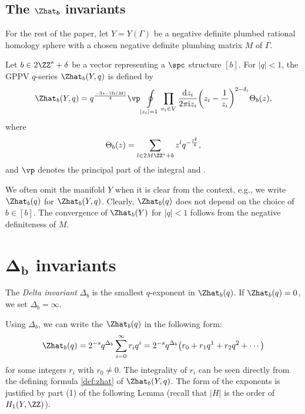 \documentclass[10pt,a4paper]{amsart}
\begin{document}
\subsection[The Zhat\_b invariants]{The $\boldsymbol{\Zhat_b}$ invariants}

For the rest of the paper, let $Y = Y(\Gamma)$ be a negative definite plumbed rational homology sphere with a chosen negative definite plumbing matrix $M$ of $\Gamma$.

\begin{Definition}
Let $b \in 2\ZZ^s + \delta$ be a vector representing a $\spc$ structure $[b]$. For $\lvert q \rvert<1$, the GPPV $q$-series $\Zhat_b(Y,q)$ is defined by
\begin{equation}\label{def:zhat}
 \Zhat_b(Y,q) = q^{\frac{-3s - \Tr(M)}{4}} \vp\oint\limits_{\lvert z_i \rvert = 1}\prod_{v_i\in V} \frac{{\rm d}z_i}{2\pi {\rm i} z_i} \biggl(z_i - \frac{1}{z_i}\biggr)^{2-\delta_i} \Theta_{b}(z),
\end{equation}
where
\begin{equation}\label{eq:theta}
 \Theta_{b}(z) = \sum_{l \in 2M\ZZ^s + b} z^l q^{-\frac{l^2}{4}},
\end{equation}
and $\vp$ denotes the principal part of the integral and .
\end{Definition}

We often omit the manifold $Y$ when it is clear from the context, e.g., we write~$\Zhat_b(q)$ for $\Zhat_b(Y,q)$. Clearly, $\Zhat_b(q)$ does not depend on the choice of $b \in [b]$. The convergence of $\Zhat_b(Y)$ for $\lvert q \rvert<1$ follows from the negative definiteness of $M$.

\section[Delta\_b invariants]{$\boldsymbol{\Delta_b}$ invariants}

\begin{Definition}
The \emph{Delta invariant} $\Delta_b$ is the smallest $q$-exponent in $\Zhat_b(q)$. If $\Zhat_b(q) = 0$, we set $\Delta_b = \infty$.
\end{Definition}

Using $\Delta_b$, we can write the $\Zhat_b(q)$ in the following form:
\[
 \Zhat_b(q) = 2^{-s} q^{\Delta_b}\sum_{i=0}^\infty r_iq^i = 2^{-s} q^{\Delta_b}\bigl(r_0 + r_1q^1 + r_2q^2 + \cdots\bigr)
\]
for some integers $r_i$ with $r_0 \neq 0$. The integrality of $r_i$ can be seen directly from the defining formula \eqref{def:zhat} of $\Zhat_b(Y,q)$. The form of the exponents is justified by part (1) of the following Lemma (recall that $\lvert H\rvert$ is the order of $H_1(Y,\ZZ)$).
\end{document}
